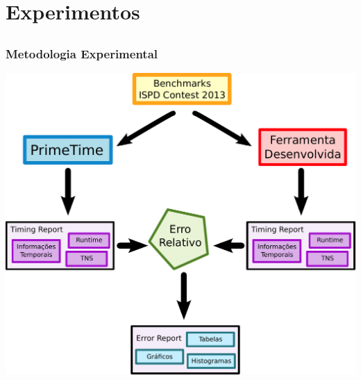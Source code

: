 \documentclass[10pt,a4paper]{beamer}
\begin{document}
	\section{Experimentos}
		
		\subsection*{}
		\begin{frame}
			\frametitle{Metodologia Experimental}
			\begin{center}
				\includegraphics[width=0.75\linewidth]{img/fluxo_validacao.pdf} 
			\end{center}	
		\end{frame}	
		
\end{document}

